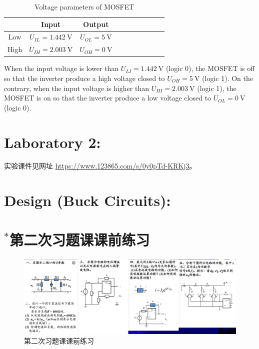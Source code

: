 \documentclass[UTF8]{report}
\theoremstyle{MyLineTheoremStyle} %
\theoremstyle{MyBlockTheoremStyle} %
\theoremstyle{MySubsubsectionStyle} %
\begin{document}
\begin{table}[H]\centering
    \caption{Voltage parameters of MOSFET}
    \label{Voltage parameters of MOSFET}
\begin{tabular}{cccccccccc}\toprule
        & Input  & Output &  \\
    \midrule
    Low & $U_{IL} = 1.442 \ \mathrm{V}$  & $U_{OL} = 5 \ \mathrm{V}$  \\
    High & $U_{IH} = 2.003 \ \mathrm{V}$ & $U_{OH} = 0 \ \mathrm{V}$  \\
    \bottomrule
\end{tabular}
\end{table}
When the input voltage is lower than $U_{LI} = 1.442 \ \mathrm{V}$ (logic 0), the MOSFET is off so that the inverter produce a high voltage closed to $U_{OH}=5 \ \mathrm{V}$ (logic 1). On the contrary, when the input voltage is higher than $U_{HI} = 2.003 \ \mathrm{V}$ (logic 1), the MOSFET is on so that the inverter produce a low voltage closed to $U_{OL} = 0 \ \mathrm{V}$ (logic 0).

\chapter{Laboratory 2: }
\thispagestyle{fancy}

实验课件见网址 \href{}{https://www.123865.com/s/0y0pTd-KRKj3}。


\chapter{Design (Buck Circuits): }\thispagestyle{fancy}






\chapter*{$^*$第二次习题课课前练习}
\thispagestyle{fancy}

\begin{figure}[H]\centering
\includegraphics[width=0.95\columnwidth]{assets/4/16b6858d371dc967c7673595957d383b_720.jpg}
\caption{ 第二次习题课课前练习}\label{第二次习题课课前练习}
\end{figure}
\end{document}
